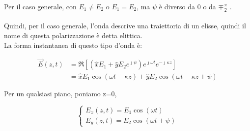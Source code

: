 Per il caso generale, con $E_1 \neq E_2$ o $E_1 = E_2$, ma $\psi$ è diverso da 0 o da $\mp \frac{\pi}{2}$ . \\ \\
Quindi, per il caso generale, l'onda descrive una traiettoria di un elisse, quindi il nome di questa polarizzazione è detta elittica. \\ 

La forma instantanea di questo tipo d'onda è: 

{\Large \begin{equation}
    \begin{split}
        \vec{E} (z, t) &= \Re[(\hat{x} E_1 + \hat{y} E_2 e^{\jmath \psi}) e^{\jmath \omega t} e^{-\jmath \kappa z}] 
        \\ &= 
    \hat{x} E_1 \cos(\omega t - \kappa z) + \hat{y} E_2 \cos(\omega t - \kappa z + \psi) 
    \end{split}
\end{equation}}


Per un qualsiasi piano, poniamo z=0, 

{\Large \begin{equation}
    \begin{cases}
        E_x (z, t) = E_1 \cos(\omega t) \\ 
        E_y (z, t) = E_2 \cos(\omega t + \psi)     
    \end{cases}
\end{equation}}

